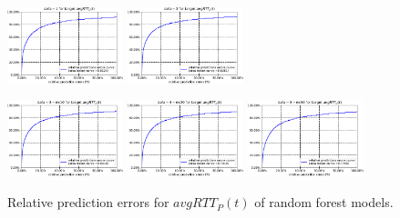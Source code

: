 \documentclass[sigconf]{acmart}
\begin{document}
	\begin{figure} [!htb] 
		\centering  
		\includegraphics[width=0.3\textwidth]{fig4/data-1-task-3-7030-RF.pdf}  
		\includegraphics[width=0.3\textwidth]{fig4/data-2-task-3-7030-RF.pdf} 
	\end{figure} 
	\begin{figure} 	
		\includegraphics[width=0.3\textwidth]{fig4/data-3-task-3-7030-windowsize10-RF.pdf}
		\includegraphics[width=0.3\textwidth]{fig4/data-3-task-3-7030-windowsize20-RF.pdf}
		\includegraphics[width=0.3\textwidth]{fig4/data-3-task-3-7030-windowsize50-RF.pdf}
		\caption{Relative prediction errors for $avgRTT_P(t)$ of random forest models.}
		\label{fig:task3_RF}
	\end{figure}
	
\end{document}
